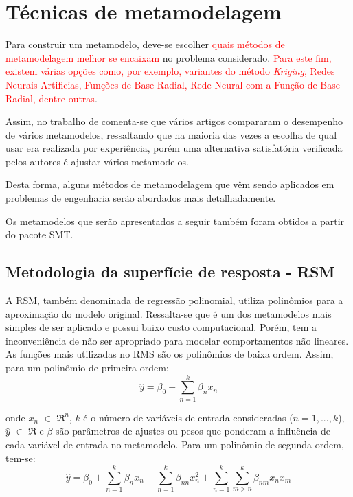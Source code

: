 \section{Técnicas de metamodelagem}\label{metamodelagem_D}

Para construir um metamodelo, deve-se escolher \textcolor{red}{quais  métodos de metamodelagem melhor se encaixam} no problema considerado. \textcolor{red}{Para este fim, existem várias opções como, por exemplo, variantes do método {\it Kriging}, Redes Neurais Artificias, Funções de Base Radial, Rede Neural com a Função de Base Radial, dentre outras}. 

Assim, no trabalho de  comenta-se que vários artigos compararam o desempenho de vários metamodelos, ressaltando que na maioria das vezes a escolha de qual usar era realizada por experiência, porém uma alternativa satisfatória verificada pelos autores é ajustar vários metamodelos. 

Desta forma, alguns métodos de metamodelagem que vêm sendo aplicados em problemas de engenharia serão abordados mais detalhadamente.

Os metamodelos que serão apresentados a seguir também foram obtidos a partir do pacote SMT. 

\subsection{Metodologia da superfície de resposta - RSM}

A RSM, também denominada de regressão polinomial, utiliza polinômios para a aproximação do modelo original. Ressalta-se que é um dos metamodelos mais simples de ser aplicado e possui baixo custo computacional. Porém, tem a inconveniência de não ser apropriado para modelar comportamentos não lineares. As funções mais utilizadas no RMS são os polinômios de baixa ordem. Assim, para um polinômio de primeira ordem:
\begin{equation}
\hat{y} = {\beta_0}+\sum_{n=1}^{k}{\beta_n}{x_n}
\label{eq:2}
\end{equation}

\noindent onde ${x}_n $ $\in$ ${\Re}^n$, $k$ é o número de variáveis de entrada consideradas ($n=1,...,k$), $\hat{y}$ $\in$ ${\Re}$ e $\beta$ são parâmetros de ajustes ou pesos que ponderam a influência de cada variável de entrada no metamodelo. Para um polinômio de segunda ordem, tem-se:
\begin{equation}
\hat{y} = \beta_0+\sum_{n=1}^{k}{\beta_n}{x_n}+\sum_{n=1}^{k}{{\beta_{nn}}}{x_n^2}+\sum_{n=1}^{k}\sum_{m>n}^{k}{{\beta_{nm}}{x_n}{x_m}}
\label{eq:3}
\end{equation}

